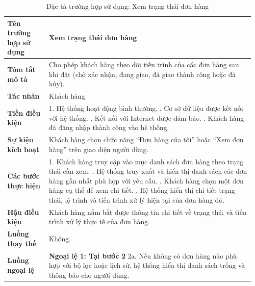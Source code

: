 {
\begin{longtable}{|>{\bfseries}p{4cm}|p{11.5cm}|}
\caption{Đặc tả trường hợp sử dụng: Xem trạng thái đơn hàng}
\label{tab:uc-view-order-status} \\
\hline
\textbf{Tên trường hợp sử dụng} & Xem trạng thái đơn hàng \\
\hline
\textbf{Tóm tắt mô tả} & Cho phép khách hàng theo dõi tiến trình của các đơn hàng sau khi đặt (chờ xác nhận, đang giao, đã giao thành công hoặc đã hủy). \\
\hline
\textbf{Tác nhân} & Khách hàng \\
\hline
\textbf{Tiền điều kiện} & 1. Hệ thống hoạt động bình thường. \newline
2. Cơ sở dữ liệu được kết nối với hệ thống. \newline
3. Kết nối với Internet được đảm bảo. \newline
4. Khách hàng đã đăng nhập thành công vào hệ thống. \\
\hline
\textbf{Sự kiện kích hoạt} & Khách hàng chọn chức năng “Đơn hàng của tôi” hoặc “Xem đơn hàng” trên giao diện người dùng. \\
\hline
\textbf{Các bước thực hiện} & 1. Khách hàng truy cập vào mục danh sách đơn hàng theo trạng thái cần xem. \newline
2. Hệ thống truy xuất và hiển thị danh sách các đơn hàng gần nhất phù hợp với yêu cầu. \newline
3. Khách hàng chọn một đơn hàng cụ thể để xem chi tiết. \newline
4. Hệ thống hiển thị chi tiết trạng thái, lộ trình và tiến trình xử lý hiện tại của đơn hàng đó. \\
\hline
\textbf{Hậu điều kiện} & Khách hàng nắm bắt được thông tin chi tiết về trạng thái và tiến trình xử lý thực tế của đơn hàng. \\
\hline
\textbf{Luồng thay thế} & Không. \\
\hline
\textbf{Luồng ngoại lệ} & \textbf{Ngoại lệ 1: Tại bước 2} \newline
2a. Nếu không có đơn hàng nào phù hợp với bộ lọc hoặc lịch sử, hệ thống hiển thị danh sách trống và thông báo cho người dùng. \\
\hline
\end{longtable}

}
